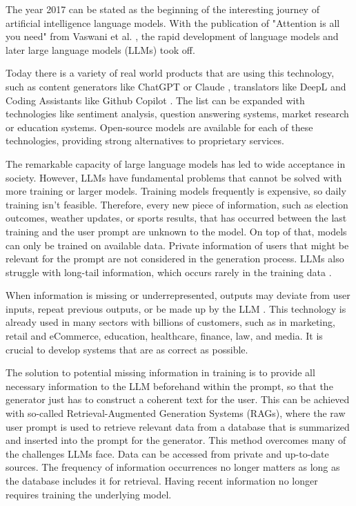 The year 2017 can be stated as the beginning of the interesting journey of artificial intelligence language models. With the publication of "Attention is all you need" from Vaswani et al. \cite{vaswani2023attentionneed}, the rapid development of language models and later large language models (LLMs) took off.

Today there is a variety of real world products that are using this technology, such as content generators like ChatGPT \cite{OpenAI_2022} or Claude \cite{Anthropic_2023}, translators like DeepL \cite{DeepL_SE} and Coding Assistants like Github Copilot \cite{Friedman_2022}. The list can be expanded with technologies like sentiment analysis, question answering systems, market research or education systems. Open-source models are available for each of these technologies, providing strong alternatives to proprietary services.

The remarkable capacity of large language models has led to wide acceptance in society. However, LLMs have fundamental problems that cannot be solved with more training or larger models. Training models frequently is expensive, so daily training isn't feasible. Therefore, every new piece of information, such as election outcomes, weather updates, or sports results, that has occurred between the last training and the user prompt are unknown to the model. On top of that, models can only be trained on available data. Private information of users that might be relevant for the prompt are not considered in the generation process. LLMs also struggle with long-tail information, which occurs rarely in the training data \cite{Kandpal.15.11.2022}.

When information is missing or underrepresented, outputs may deviate from user inputs, repeat previous outputs, or be made up by the LLM \cite{Zhang.03.09.2023}. This technology is already used in many sectors with billions of customers, such as in marketing, retail and eCommerce, education, healthcare, finance, law, and media. It is crucial to develop systems that are as correct as possible.

The solution to potential missing information in training is to provide all necessary information to the LLM beforehand within the prompt, so that the generator just has to construct a coherent text for the user. This can be achieved with so-called Retrieval-Augmented Generation Systems (RAGs), where the raw user prompt is used to retrieve relevant data from a database that is summarized and inserted into the prompt for the generator. This method overcomes many of the challenges LLMs face. Data can be accessed from private and up-to-date sources. The frequency of information occurrences no longer matters as long as the database includes it for retrieval. Having recent information no longer requires training the underlying model.


